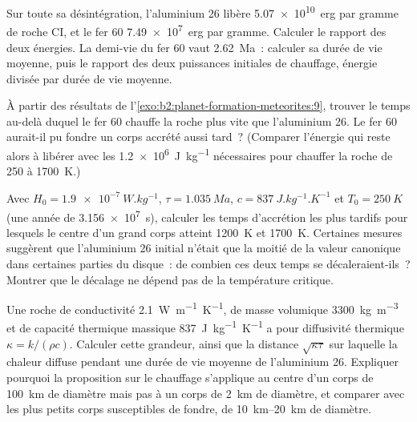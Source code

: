 \begin{exercise}[$\star\star$]\label{exo:b2:planet-formation-meteorites:9}
Sur toute sa désintégration, l'aluminium 26 libère \qty{5.07e10}{erg} par gramme de roche CI, et le fer 60
\qty{7.49e7}{erg} par gramme. Calculer le rapport des deux énergies. La demi-vie du fer 60 vaut
\qty{2.62}{Ma}~: calculer sa durée de vie moyenne, puis le rapport des deux puissances initiales de
chauffage, énergie divisée par durée de vie moyenne.
\end{exercise}

\begin{exercise}[$\star\star\star$]\label{exo:b2:planet-formation-meteorites:10}
À partir des résultats de l'\cref{exo:b2:planet-formation-meteorites:9}, trouver le temps au-delà duquel le
fer 60 chauffe la roche plus vite que l'aluminium 26. Le fer 60 aurait-il pu fondre un corps accrété aussi
tard~? (Comparer l'énergie qui reste alors à libérer avec les \qty{1.2e6}{J.kg^{-1}} nécessaires pour
chauffer la roche de \num{250} à \qty{1700}{K}.)
\end{exercise}

\begin{exercise}[$\star\star\star$]\label{exo:b2:planet-formation-meteorites:11}
Avec $H_0 = \qty{1.9e-7}{W.kg^{-1}}$, $\tau = \qty{1.035}{Ma}$,
$c = \qty{837}{J.kg^{-1}.K^{-1}}$ et $T_0 = \qty{250}{K}$ (une année de
\qty{3.156e7}{s}), calculer les temps d'accrétion les plus tardifs pour lesquels le
centre d'un grand corps atteint \qty{1200}{K} et \qty{1700}{K}. Certaines mesures
suggèrent que l'aluminium 26 initial n'était que la moitié de la valeur canonique dans
certaines parties du disque~: de combien ces deux temps se décaleraient-ils~? Montrer que
le décalage ne dépend pas de la température critique.
\end{exercise}

\begin{exercise}[$\star\star\star$]\label{exo:b2:planet-formation-meteorites:12}
Une roche de conductivité \qty{2.1}{W.m^{-1}.K^{-1}}, de masse volumique \qty{3300}{kg.m^{-3}} et de
capacité thermique massique \qty{837}{J.kg^{-1}.K^{-1}} a pour diffusivité thermique
$\kappa = k/(\rho c)$. Calculer cette grandeur, ainsi que la distance $\sqrt{\kappa\tau}$ sur
laquelle la chaleur diffuse pendant une durée de vie moyenne de l'aluminium 26. Expliquer pourquoi
la proposition sur le chauffage s'applique au centre d'un corps de \qty{100}{km} de diamètre mais
pas à un corps de \qty{2}{km} de diamètre, et comparer avec les plus petits corps susceptibles de
fondre, de \qtyrange{10}{20}{km} de diamètre.
\end{exercise}

